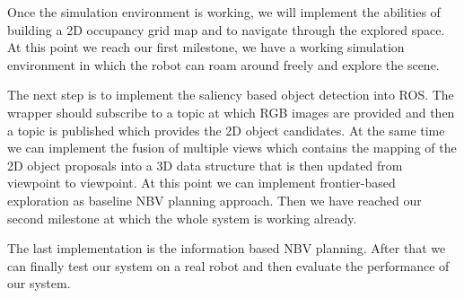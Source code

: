\documentclass[a4paper,11pt,english]{article}
\begin{document}
Once the simulation environment is working, we will implement the abilities of building a 2D occupancy grid map and to navigate through the explored space.
At this point we reach our first milestone, we have a working simulation environment in which the robot can roam around freely and explore the scene.

The next step is to implement the saliency based object detection into ROS. The wrapper should subscribe to a topic at which RGB images are provided and then a topic is published which provides the 2D object candidates.
At the same time we can implement the fusion of multiple views which contains the mapping of the 2D object proposals into a 3D data structure that is then updated from viewpoint to viewpoint.
At this point we can implement frontier-based exploration as baseline NBV planning approach.
Then we have reached our second milestone at which the whole system is working already.

The last implementation is the information based NBV planning.
After that we can finally test our system on a real robot and then evaluate the performance of our system. 


\newpage


\end{document}
